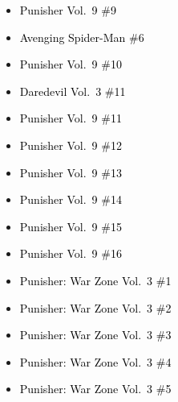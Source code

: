 \documentclass[12pt]{article}
\newcommand{\checkbox}{\raisebox{0.0ex}{\fbox{\rule{0ex}{1.5ex} \rule{1.5ex}{0ex}}}}
\begin{document}
\vspace{0.3cm}
\noindent
\begin{tcolorbox}[
  colback=white!95!gray,
  colframe=black,
  width=\textwidth,
  arc=4mm,
  auto outer arc,
  boxrule=0.8pt,
  left=8pt,right=8pt,top=8pt,bottom=8pt
]
\begin{itemize}[left=0pt,label={\checkbox}]
    \item \textcolor{black}{Punisher Vol.\ 9 \#9}
    \item \textcolor{black}{Avenging Spider-Man \#6}
    \item \textcolor{black}{Punisher Vol.\ 9 \#10}
    \item \textcolor{black}{Daredevil Vol.\ 3 \#11}
    \item \textcolor{black}{Punisher Vol.\ 9 \#11}
    \item \textcolor{black}{Punisher Vol.\ 9 \#12}
    \item \textcolor{black}{Punisher Vol.\ 9 \#13}
    \item \textcolor{black}{Punisher Vol.\ 9 \#14}
    \item \textcolor{black}{Punisher Vol.\ 9 \#15}
    \item \textcolor{black}{Punisher Vol.\ 9 \#16}
    \item \textcolor{black}{Punisher: War Zone Vol.\ 3 \#1}
    \item \textcolor{black}{Punisher: War Zone Vol.\ 3 \#2}
    \item \textcolor{black}{Punisher: War Zone Vol.\ 3 \#3}
    \item \textcolor{black}{Punisher: War Zone Vol.\ 3 \#4}
    \item \textcolor{black}{Punisher: War Zone Vol.\ 3 \#5}
\end{itemize}
\end{tcolorbox}

\newpage
{}
\end{document}
